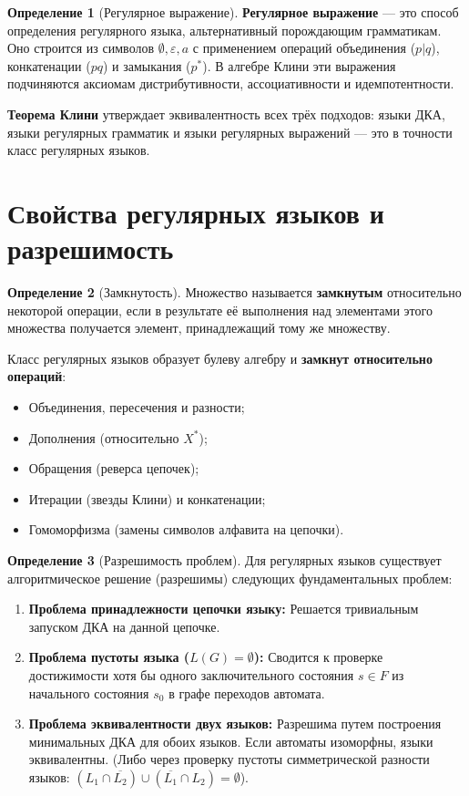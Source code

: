 \documentclass[12pt,a4paper]{article}
\theoremstyle{definition}
\newtheorem{definition}{Определение}
\theoremstyle{plain}
\theoremstyle{remark}
\begin{document}
\begin{definition}[Регулярное выражение]
\textbf{Регулярное выражение} — это способ определения регулярного языка, альтернативный порождающим грамматикам. Оно строится из символов $\emptyset, \varepsilon, a$ с применением операций объединения ($p|q$), конкатенации ($pq$) и замыкания ($p^*$). В алгебре Клини эти выражения подчиняются аксиомам дистрибутивности, ассоциативности и идемпотентности.
\end{definition}

\textbf{Теорема Клини} утверждает эквивалентность всех трёх подходов: языки ДКА, языки регулярных грамматик и языки регулярных выражений — это в точности класс регулярных языков.

\section{Свойства регулярных языков и разрешимость}

\begin{definition}[Замкнутость]
Множество называется \textbf{замкнутым} относительно некоторой операции, если в результате её выполнения над элементами этого множества получается элемент, принадлежащий тому же множеству.
\end{definition}

Класс регулярных языков образует булеву алгебру и \textbf{замкнут относительно операций}:
\begin{itemize}
    \item Объединения, пересечения и разности;
    \item Дополнения (относительно $X^*$);
    \item Обращения (реверса цепочек);
    \item Итерации (звезды Клини) и конкатенации;
    \item Гомоморфизма (замены символов алфавита на цепочки).
\end{itemize}

\begin{definition}[Разрешимость проблем]
Для регулярных языков существует алгоритмическое решение (разрешимы) следующих фундаментальных проблем:
\begin{enumerate}
    \item \textbf{Проблема принадлежности цепочки языку:} Решается тривиальным запуском ДКА на данной цепочке.
    \item \textbf{Проблема пустоты языка ($L(G) = \emptyset$):} Сводится к проверке достижимости хотя бы одного заключительного состояния $s \in F$ из начального состояния $s_0$ в графе переходов автомата.
    \item \textbf{Проблема эквивалентности двух языков:} Разрешима путем построения минимальных ДКА для обоих языков. Если автоматы изоморфны, языки эквивалентны. (Либо через проверку пустоты симметрической разности языков: $(L_1 \cap \overline{L_2}) \cup (\overline{L_1} \cap L_2) = \emptyset$).
\end{enumerate}
\end{definition}
\end{document}
